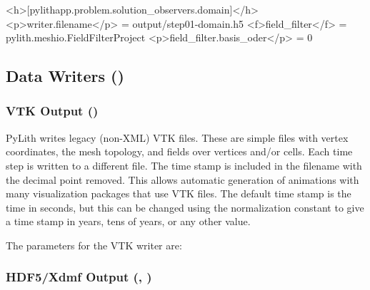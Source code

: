 \begin{inventory}
\begin{cfg}
<h>[pylithapp.problem.solution_observers.domain]</h>
<p>writer.filename</p> = output/step01-domain.h5
<f>field_filter</f> = pylith.meshio.FieldFilterProject
<p>field_filter.basis_oder</p> = 0
\end{cfg}


\subsection{Data Writers ()}

\subsubsection{VTK Output ()}

PyLith writes legacy (non-XML) VTK files. These are simple files with
vertex coordinates, the mesh topology, and fields over vertices and/or
cells. Each time step is written to a different file. The time stamp
is included in the filename with the decimal point removed. This allows
automatic generation of animations with many visualization packages
that use VTK files. The default time stamp is the time in seconds,
but this can be changed using the normalization constant to give a
time stamp in years, tens of years, or any other value.


The parameters for the VTK writer are:
\begin{inventory}
\end{inventory}


\subsubsection{HDF5/Xdmf Output (, )}
\label{sub:HDF5/Xdmf-Output}


\end{inventory}
